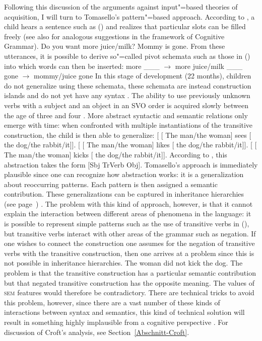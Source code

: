 Following this discussion of the arguments against input"=based theories of acquisition, I will turn to Tomasello's pattern"=based approach\indexcxgstart.
According to \citet[Section~4.2.1]{Tomasello2003a}, a child hears a sentence such as () and realizes that particular slots can
be filled freely (see also  for analogous suggestions in the framework of Cognitive Grammar).
\eal
\ex Do you want more juice/milk?
\ex Mommy is gone.
\zl
From these utterances, it is possible to derive so"=called pivot schemata such as those in () into which words
can then be inserted:
\eal
\ex more \_\_\_ $\to$ more juice/milk
\ex \_\_\_ gone $\to$ mommy/juice gone
\zl
In this stage of development (22 months), children do not generalize using these schemata, these schemata are instead construction islands
and do not yet have any syntax \citep{TADR97a}. The ability to use previously unknown verbs with a subject and an object in an SVO order
is acquired slowly between the age of three and four \citep[--129]{Tomasello2003a}.
More abstract syntactic and semantic relations only emerge with time: when confronted with multiple instantiations of the transitive construction,
the child is then able to generalize:
\eal
\label{Beispiele-fuer-Transitivkonstruktion}
\ex {}[ [ The man/the woman] sees  [ the dog/the rabbit/it]].
\ex {}[ [ The man/the woman] likes [ the dog/the rabbit/it]].
\ex {}[ [ The man/the woman] kicks [ the dog/the rabbit/it]].
\zl
According to \citet[]{Tomasello2003a}, this abstraction takes the form [Sbj TrVerb Obj]. 
Tomasello's approach is immediately plausible since one can recognize how abstraction works:
it is a generalization about reoccurring patterns. Each pattern is then assigned a semantic contribution.
These generalizations can be captured in inheritance hierarchies (see page~\pageref{Seite-Typhierarchie}) \citep[]{Croft2001a}.
The problem with this kind of approach, however, is that it cannot explain the interaction between different areas of phenomena in the
language: it is possible to represent simple patterns such as the use of transitive verbs in
(), but transitive verbs interact with other areas of the grammar such as negation. If one wishes to connect the construction one assumes for the negation
of transitive verbs with the transitive construction, then one arrives at a problem since this is not possible in
inheritance hierarchies.
\ea
The woman did not kick the dog.
\z
\addlines
The problem is that the transitive construction has a particular semantic contribution but that
negated transitive construction has the opposite meaning. The values of \textsc{sem} features would
therefore be contradictory. There are technical tricks to avoid this problem, however, since there
are a vast number of these kinds of interactions between syntax and semantics, this kind of
technical solution will result in something highly implausible from a cognitive perspective
\citep{Mueller2006d,Mueller2007d,MuellerLehrbuch1,MuellerPersian,MWArgSt}. 
For discussion of Croft's analysis, see Section~\ref{Abschnitt-Croft}.

